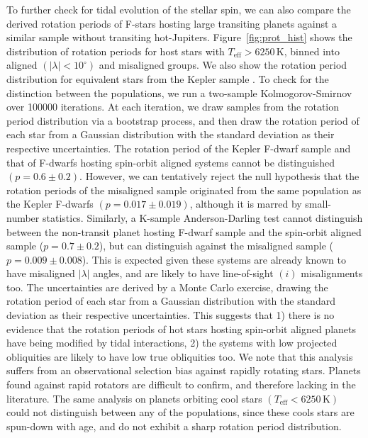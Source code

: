 \documentclass[useAMS,usenatbib]{mn2e}
\begin{document}
To further check for tidal evolution of the stellar spin, we can also compare the derived rotation periods of F-stars hosting large transiting planets against a similar sample without transiting hot-Jupiters. Figure~\ref{fig:prot_hist} shows the distribution of rotation periods for host stars with $T_\text{eff}>6250\,\text{K}$, binned into aligned $(|\lambda| < 10^\circ)$ and misaligned groups. We also show the rotation period distribution for equivalent stars from the Kepler sample \citep{2013A&amp;A...557L..10N}. To check for the distinction between the populations, we run a two-sample Kolmogorov-Smirnov over 100000 iterations. At each iteration, we draw samples from the rotation period distribution via a bootstrap process, and then draw the rotation period of each star from a Gaussian distribution with the standard deviation as their respective uncertainties. The rotation period of the Kepler F-dwarf sample and that of F-dwarfs hosting spin-orbit aligned systems cannot be distinguished $(p=0.6\pm0.2)$. However, we can tentatively reject the null hypothesis that the rotation periods of the misaligned sample originated from the same population as the Kepler F-dwarfs $(p=0.017\pm0.019)$, although it is marred by small-number statistics. Similarly, a K-sample Anderson-Darling test cannot distinguish between the non-transit planet hosting F-dwarf sample and the spin-orbit aligned sample ($p=0.7\pm0.2$), but can distinguish against the misaligned sample ($p=0.009\pm0.008$). This is expected given these systems are already known to have misaligned $|\lambda|$ angles, and are likely to have line-of-sight $(i)$ misalignments too. The uncertainties are derived by a Monte Carlo exercise, drawing the rotation period of each star from a Gaussian distribution with the standard deviation as their respective uncertainties. This suggests that 1) there is no evidence that the rotation periods of hot stars hosting spin-orbit aligned planets have being modified by tidal interactions, 2) the systems with low projected obliquities are likely to have low true obliquities too. We note that this analysis suffers from an observational selection bias against rapidly rotating stars. Planets found against rapid rotators are difficult to confirm, and therefore lacking in the literature. The same analysis on planets orbiting cool stars $(T_\text{eff}<6250\,\text{K})$ could not distinguish between any of the populations, since these cools stars are spun-down with age, and do not exhibit a sharp rotation period distribution.
\end{document}
